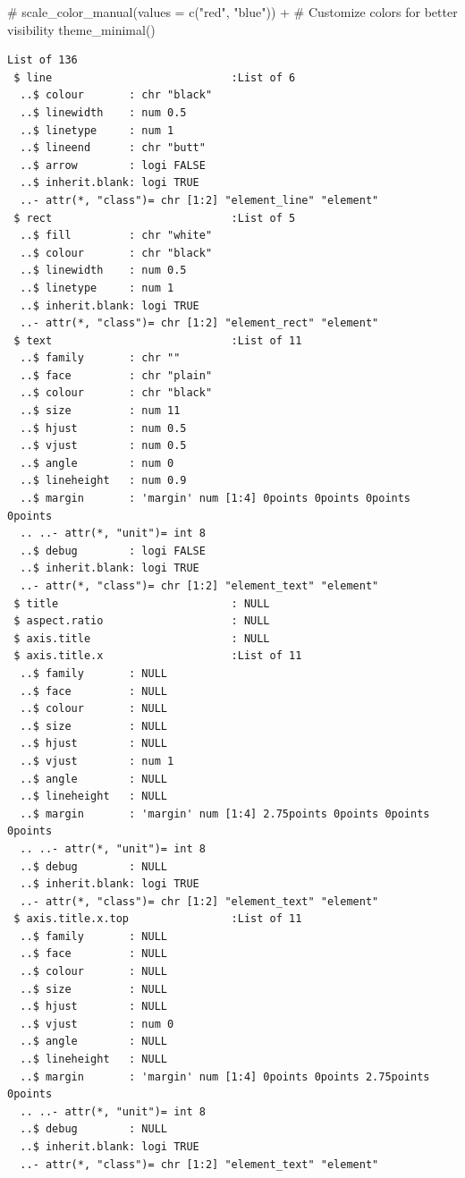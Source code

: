\documentclass[
  letterpaper,
  DIV=11,
  numbers=noendperiod]{scrartcl}
\newenvironment{Shaded}{\begin{snugshade}}{\end{snugshade}}
\newcommand{\CommentTok}[1]{\textcolor[rgb]{0.37,0.37,0.37}{#1}}
\newcommand{\FunctionTok}[1]{\textcolor[rgb]{0.28,0.35,0.67}{#1}}
\newcommand{\NormalTok}[1]{\textcolor[rgb]{0.00,0.23,0.31}{#1}}
\begin{document}
\begin{Shaded}
\begin{Highlighting}[]
 \CommentTok{\# scale\_color\_manual(values = c("red", "blue")) +  \# Customize colors for better visibility}
  \FunctionTok{theme\_minimal}\NormalTok{()}
\end{Highlighting}
\end{Shaded}

\begin{verbatim}
List of 136
 $ line                            :List of 6
  ..$ colour       : chr "black"
  ..$ linewidth    : num 0.5
  ..$ linetype     : num 1
  ..$ lineend      : chr "butt"
  ..$ arrow        : logi FALSE
  ..$ inherit.blank: logi TRUE
  ..- attr(*, "class")= chr [1:2] "element_line" "element"
 $ rect                            :List of 5
  ..$ fill         : chr "white"
  ..$ colour       : chr "black"
  ..$ linewidth    : num 0.5
  ..$ linetype     : num 1
  ..$ inherit.blank: logi TRUE
  ..- attr(*, "class")= chr [1:2] "element_rect" "element"
 $ text                            :List of 11
  ..$ family       : chr ""
  ..$ face         : chr "plain"
  ..$ colour       : chr "black"
  ..$ size         : num 11
  ..$ hjust        : num 0.5
  ..$ vjust        : num 0.5
  ..$ angle        : num 0
  ..$ lineheight   : num 0.9
  ..$ margin       : 'margin' num [1:4] 0points 0points 0points 0points
  .. ..- attr(*, "unit")= int 8
  ..$ debug        : logi FALSE
  ..$ inherit.blank: logi TRUE
  ..- attr(*, "class")= chr [1:2] "element_text" "element"
 $ title                           : NULL
 $ aspect.ratio                    : NULL
 $ axis.title                      : NULL
 $ axis.title.x                    :List of 11
  ..$ family       : NULL
  ..$ face         : NULL
  ..$ colour       : NULL
  ..$ size         : NULL
  ..$ hjust        : NULL
  ..$ vjust        : num 1
  ..$ angle        : NULL
  ..$ lineheight   : NULL
  ..$ margin       : 'margin' num [1:4] 2.75points 0points 0points 0points
  .. ..- attr(*, "unit")= int 8
  ..$ debug        : NULL
  ..$ inherit.blank: logi TRUE
  ..- attr(*, "class")= chr [1:2] "element_text" "element"
 $ axis.title.x.top                :List of 11
  ..$ family       : NULL
  ..$ face         : NULL
  ..$ colour       : NULL
  ..$ size         : NULL
  ..$ hjust        : NULL
  ..$ vjust        : num 0
  ..$ angle        : NULL
  ..$ lineheight   : NULL
  ..$ margin       : 'margin' num [1:4] 0points 0points 2.75points 0points
  .. ..- attr(*, "unit")= int 8
  ..$ debug        : NULL
  ..$ inherit.blank: logi TRUE
  ..- attr(*, "class")= chr [1:2] "element_text" "element"

\end{verbatim}
\end{document}
